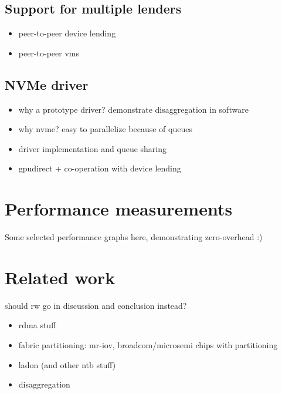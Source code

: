 \subsection{Support for multiple lenders}
\begin{itemize}
    \item peer-to-peer device lending
    \item peer-to-peer vms
\end{itemize}


\subsection{NVMe driver}\label{sec:nvme}
\begin{itemize}
    \item why a prototype driver? demonstrate disaggregation in software
    \item why nvme? easy to parallelize because of queues
    \item driver implementation and queue sharing
    \item gpudirect + co-operation with device lending
\end{itemize}


\section{Performance measurements}\label{sec:eval}
Some selected performance graphs here, demonstrating zero-overhead :)

\section{Related work}\label{sec:rw}
should rw go in discussion and conclusion instead?
\begin{itemize}
    \item rdma stuff
    \item fabric partitioning: mr-iov, broadcom/microsemi chips with partitioning
    \item ladon (and other ntb stuff)
    \item disaggregation
\end{itemize}

%
